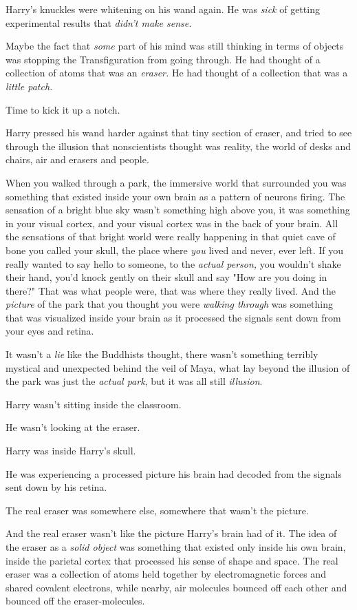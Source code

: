 Harry's knuckles were whitening on his wand again. He was \emph{sick} of
getting experimental results that \emph{didn't make sense.}

Maybe the fact that \emph{some} part of his mind was still thinking in terms of
objects was stopping the Transfiguration from going through. He had thought of
a collection of atoms that was an \emph{eraser.} He had thought of a collection
that was a \emph{little patch.}

Time to kick it up a notch.

Harry pressed his wand harder against that tiny section of eraser, and tried to
see through the illusion that nonscientists thought was reality, the world of
desks and chairs, air and erasers and people.

When you walked through a park, the immersive world that surrounded you was
something that existed inside your own brain as a pattern of neurons firing.
The sensation of a bright blue sky wasn't something high above you, it was
something in your visual cortex, and your visual cortex was in the back of your
brain. All the sensations of that bright world were really happening in that
quiet cave of bone you called your skull, the place where \emph{you} lived and
never, ever left. If you really wanted to say hello to someone, to the
\emph{actual person,} you wouldn't shake their hand, you'd knock gently on
their skull and say "How are you doing in there?" That was what people were,
that was where they really lived. And the \emph{picture} of the park that you
thought you were \emph{walking through} was something that was visualized
inside your brain as it processed the signals sent down from your eyes and
retina.

It wasn't a \emph{lie} like the Buddhists thought, there wasn't something
terribly mystical and unexpected behind the veil of Maya, what lay beyond the
illusion of the park was just the \emph{actual park}, but it was all still
\emph{illusion}.

Harry wasn't sitting inside the classroom.

He wasn't looking at the eraser.

Harry was inside Harry's skull.

He was experiencing a processed picture his brain had decoded from the signals
sent down by his retina.

The real eraser was somewhere else, somewhere that wasn't the picture.

And the real eraser wasn't like the picture Harry's brain had of it. The idea
of the eraser as a \emph{solid object} was something that existed only inside
his own brain, inside the parietal cortex that processed his sense of shape and
space. The real eraser was a collection of atoms held together by
electromagnetic forces and shared covalent electrons, while nearby, air
molecules bounced off each other and bounced off the eraser-molecules.

